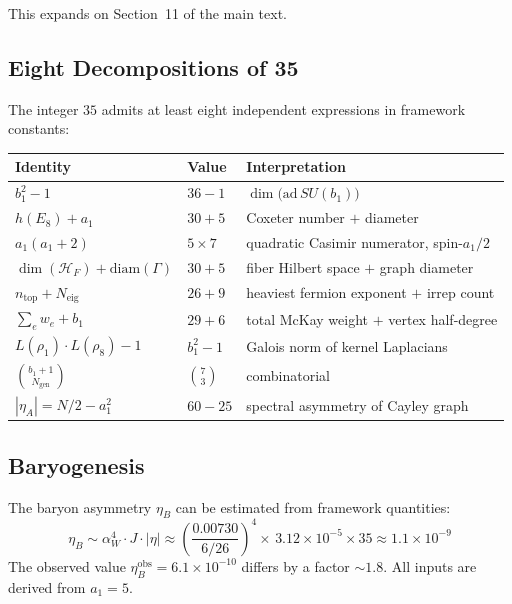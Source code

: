 \documentclass[12pt,a4paper]{article}
\theoremstyle{definition}
\begin{document}
This expands on Section~11 of the main text.

\subsection{Eight Decompositions of 35}

The integer $35$ admits at least eight independent expressions in framework constants:
\begin{center}
\begin{tabular}{lll}
\toprule
\textbf{Identity} & \textbf{Value} & \textbf{Interpretation} \\
\midrule
$b_1^2 - 1$ & $36 - 1$ & $\dim\bigl(\mathrm{ad}\,SU(b_1)\bigr)$ \\
$h(E_8) + a_1$ & $30 + 5$ & Coxeter number $+$ diameter \\
$a_1(a_1 + 2)$ & $5 \times 7$ & quadratic Casimir numerator, spin-$a_1/2$ \\
$\dim(\mathcal{H}_F) + \mathrm{diam}(\Gamma)$ & $30 + 5$ & fiber Hilbert space $+$ graph diameter \\
$n_{\text{top}} + N_{\text{eig}}$ & $26 + 9$ & heaviest fermion exponent $+$ irrep count \\
$\displaystyle\sum_e w_e + b_1$ & $29 + 6$ & total McKay weight $+$ vertex half-degree \\
$L(\rho_1)\cdot L(\rho_8) - 1$ & $b_1^2 - 1$ & Galois norm of kernel Laplacians \\
$\binom{b_1+1}{N_{\text{gen}}}$ & $\binom{7}{3}$ & combinatorial \\
$|\eta_A| = N/2 - a_1^2$ & $60 - 25$ & spectral asymmetry of Cayley graph \\
\bottomrule
\end{tabular}
\end{center}

\subsection{Baryogenesis}

The baryon asymmetry $\eta_B$ can be estimated from framework quantities:
\begin{equation}
\eta_B \sim \alpha_W^4 \cdot J \cdot |\eta| \approx \left(\frac{0.00730}{6/26}\right)^{\!4} \!\times\, 3.12 \times 10^{-5} \times 35 \approx 1.1 \times 10^{-9}
\end{equation}
The observed value $\eta_B^{\text{obs}} = 6.1 \times 10^{-10}$ differs by a factor $\sim 1.8$.  All inputs are derived from $a_1 = 5$.
\end{document}
